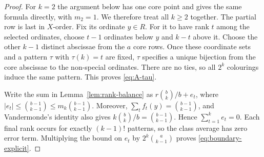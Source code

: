 \documentclass[11pt,letterpaper]{article}
\begin{document}
\begin{proof}
For $k=2$ the argument below has one core point and gives the same formula
directly, with $m_2=1$.  We therefore treat all $k\geq2$ together.
The partial row is last in $X$-order.  Fix its ordinate $y\in R$.
For it to have rank $t$ among the selected ordinates, choose $t-1$
ordinates below $y$ and $k-t$ above it.  Choose the other $k-1$
distinct abscissae from the $a$ core rows.  Once these coordinate sets
and a pattern $\tau$ with $\tau(k)=t$ are fixed, $\tau$ specifies a
unique bijection from the core abscissae to the non-special ordinates.
There are no ties, so all $2^k$ colourings induce the same pattern.
This proves \eqref{eq:A-tau}.

Write the sum in Lemma~\ref{lem:rank-balance} as
$r\binom bk/b+e_t$, where
$|e_t|\leq\binom{b-1}{k-1}\leq m_k\binom{b-1}{k-1}$.
Moreover, $\sum_t f_t(y)=\binom{b-1}{k-1}$, and Vandermonde's identity
also gives $k\binom bk/b=\binom{b-1}{k-1}$.  Hence
$\sum_{t=1}^k e_t=0$.  Each final rank occurs for exactly $(k-1)!$
patterns, so the class average has zero error term.  Multiplying the
bound on $e_t$ by $2^k\binom{a}{k-1}$ proves
\eqref{eq:boundary-explicit}.
\end{proof}
\end{document}
